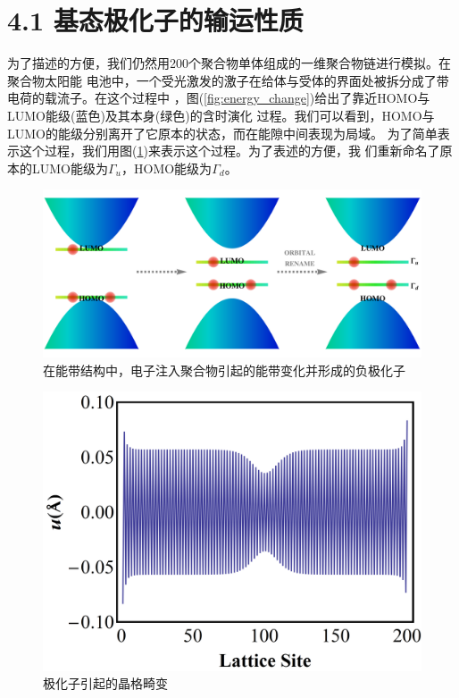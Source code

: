 \documentclass[12pt,]{report}
\begin{document}
\section{4.1
基态极化子的输运性质}\label{ux57faux6001ux6781ux5316ux5b50ux7684ux8f93ux8fd0ux6027ux8d28}

为了描述的方便，我们仍然用200个聚合物单体组成的一维聚合物链进行模拟。在聚合物太阳能
电池中，一个受光激发的激子在给体与受体的界面处被拆分成了带电荷的载流子。在这个过程中
，图(\ref{fig:energy_change})给出了靠近HOMO与LUMO能级(蓝色)及其本身(绿色)的含时演化
过程。我们可以看到，HOMO与LUMO的能级分别离开了它原本的状态，而在能隙中间表现为局域。
为了简单表示这个过程，我们用图(\ref{fig:polaron})来表示这个过程。为了表述的方便，我
们重新命名了原本的LUMO能级为\(\Gamma_u\)，HOMO能级为\(\Gamma_d\)。

\begin{figure}[h!]
    \centering
    \includegraphics[scale=0.5]{./figures/polaron.png}
    \caption{在能带结构中，电子注入聚合物引起的能带变化并形成的负极化子}
    \label{fig:polaron}
\end{figure}

\begin{figure}[h!]
    \centering
    \includegraphics[scale=0.5]{./figures/polaron_lattice.png}
    \caption{极化子引起的晶格畸变}
    \label{fig:polaron_lattice}
\end{figure}
\end{document}

